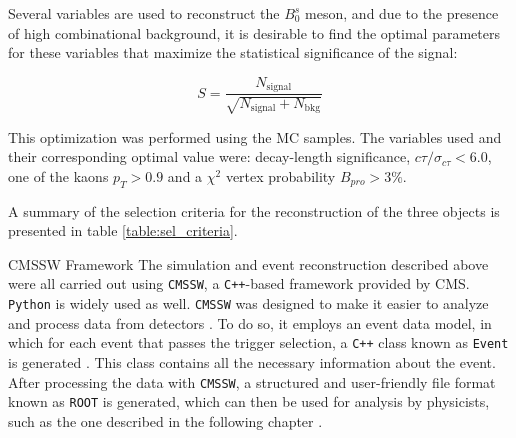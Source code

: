 Several variables are used to reconstruct the $B_0^s$ meson, and due to the presence of high combinational background, it is desirable to find the optimal parameters for these variables that maximize the statistical significance of the signal:

\begin{equation}
	S = \frac{N_{\text{signal}}}{\sqrt{N_{\text{signal}} + N_{\text{bkg}}}}
\end{equation}

This optimization was performed using the MC samples. The variables used and their corresponding optimal value were: decay-length significance, $c\tau / \sigma_{c\tau}< 6.0 $, one of the kaons $p_T > 0.9$ and a $\chi^2$ vertex probability $B_{pro} > 3 \%$.

A summary of the selection criteria for the reconstruction of the three objects is presented in table \ref{table:sel_criteria}.
\begin{section}{CMSSW Framework}
The simulation and event reconstruction described above were all carried out using \verb|CMSSW|, a \verb|C++|-based framework provided by CMS. \verb|Python| is widely used as well. \verb|CMSSW| was designed to make it easier to analyze and process data from detectors \cite{di2020measurement, twiki2013}. To do so, it employs an event data model, in which for each event that passes the trigger selection, a \verb|C++| class known as \verb|Event| is generated \cite{fedi2016studies, muhammad2021measurement}. This class contains all the necessary information about the event. After processing the data with  \verb|CMSSW|, a structured and user-friendly file format known as  \verb|ROOT| is generated, which can then be used for analysis by physicists, such as the one described in the following chapter \cite{di2020measurement}.
\end{section}
\setlength{\tabcolsep}{0.5em} %

